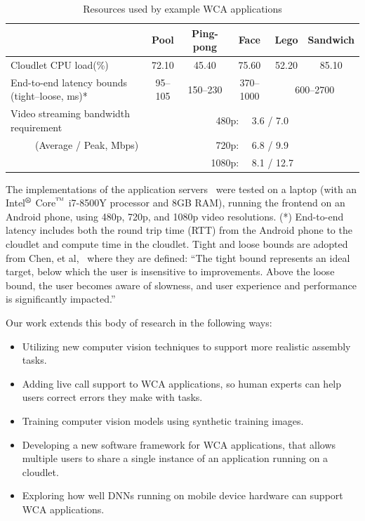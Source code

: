 \begin{table}
    \begin{tabular}{|l||c|c|c|c|c|}
    \hline
    & Pool & Ping-pong & Face & Lego & Sandwich \\
    \hline
    \hline
    Cloudlet CPU load(\%) & 72.10 & 45.40 & 75.60 & 52.20 & 85.10 \\
    \hline
    End-to-end latency bounds (tight--loose, ms)* & 95--105 & 150--230 & 370--1000 & \multicolumn{2}{c|}{600--2700} \\
    \hline
    Video streaming bandwidth requirement    & \multicolumn{5}{c|}{480p:~~ 3.6 / 7.0} \\
    ~~~~~(Average / Peak, Mbps)              & \multicolumn{5}{c|}{720p:~~ 6.8 / 9.9} \\
                                             & \multicolumn{5}{c|}{1080p:~~ 8.1 / 12.7} \\
    \hline
    \end{tabular}
    \begin{captiontext}
      The implementations of the application servers~\cite{chen2017} were tested
      on a laptop (with an Intel$^{\mbox{\footnotesize\textregistered}}$
      Core$^{\mbox{\footnotesize\texttrademark}}$ i7-8500Y processor and 8GB RAM),
      running the frontend on an Android phone, using 480p, 720p, and 1080p
      video resolutions.
      (*) End-to-end latency includes both the round trip time (RTT) from the
      Android phone to the cloudlet and compute time in the cloudlet.
      Tight and loose bounds are adopted from Chen, et al,~\cite{chen2017}
      where they are defined:
      ``The tight bound represents an ideal target, below which the user is
      insensitive to improvements. Above the loose bound, the user becomes aware
      of slowness, and user experience and performance is significantly
      impacted.''
    \end{captiontext}
    \caption{
      Resources used by example WCA applications
    }\label{fig:wca_apps}
\end{table}

Our work extends this body of research in the following ways:
\begin{itemize}
\item Utilizing new computer vision techniques to support more realistic
  assembly tasks.
\item Adding live call support to WCA applications, so human experts can help
  users correct errors they make with tasks.
\item Training computer vision models using synthetic training images.
\item Developing a new software framework for WCA applications, that allows
  multiple users to share a single instance of an application running on a
  cloudlet.
\item Exploring how well DNNs running on mobile device hardware can support
  WCA applications.
\end{itemize}

